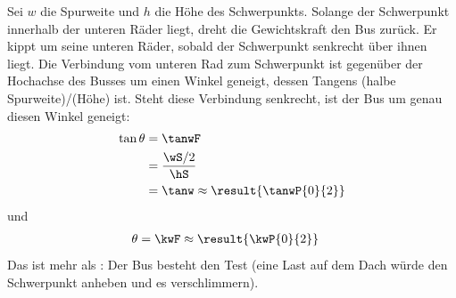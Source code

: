 Sei $w$ die Spurweite und $h$ die Höhe des Schwerpunkts. Solange der Schwerpunkt innerhalb der unteren Räder liegt, dreht die Gewichtskraft den Bus zurück. Er kippt um seine unteren Räder, sobald der Schwerpunkt senkrecht über ihnen liegt. Die Verbindung vom unteren Rad zum Schwerpunkt ist gegenüber der Hochachse des Busses um einen Winkel geneigt, dessen Tangens (halbe Spurweite)/(Höhe) ist. Steht diese Verbindung senkrecht, ist der Bus um genau diesen Winkel geneigt:
\begin{align}
 \tan\theta &= \tanwF \\
   &= \frac{\wS/2}{\hS} \\
   &= \tanw \approx \result{\tanwP{0}{2}}
\end{align}
und
\begin{align}
 \theta &= \kwF \approx \result{\kwP{0}{2}}
\end{align}
Das ist mehr als \wminO: Der Bus besteht den Test (eine Last auf dem Dach würde den Schwerpunkt anheben und es verschlimmern).
